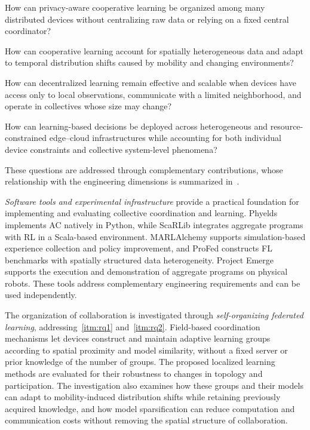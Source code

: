 \begin{questions}
\item
How can privacy-aware cooperative learning be organized among many distributed
devices without centralizing raw data or relying on a fixed central coordinator?
\label{itm:rq1}

\item
How can cooperative learning account for spatially heterogeneous data and adapt
to temporal distribution shifts caused by mobility and changing environments?
\label{itm:rq2}

\item
How can decentralized learning remain effective and scalable when devices have
access only to local observations, communicate with a limited neighborhood,
and operate in collectives whose size may change?
\label{itm:rq3}

\item
How can learning-based decisions be deployed across heterogeneous and
resource-constrained edge--cloud infrastructures while accounting for both
individual device constraints and collective system-level phenomena?
\label{itm:rq4}

\end{questions}

These questions are addressed through complementary contributions,
 whose relationship with the engineering dimensions is summarized
 in~.

\emph{Software tools and experimental infrastructure}
 provide a practical foundation for implementing and evaluating
 collective coordination and learning.
%
Phyelds implements \gls{AC} natively in Python,
 while ScaRLib integrates aggregate programs with \gls{RL} in a Scala-based environment.
%
MARLAlchemy supports simulation-based experience collection and policy improvement,
 and ProFed constructs \gls{FL} benchmarks with spatially structured data heterogeneity.
%
Project Emerge supports the execution and demonstration
 of aggregate programs on physical robots.
%
These tools address complementary engineering requirements
 and can be used independently.

The organization of collaboration is investigated through
 \emph{self-organizing federated learning},
 addressing~\ref{itm:rq1} and~\ref{itm:rq2}.
%
Field-based coordination mechanisms let devices construct
 and maintain adaptive learning groups according to spatial proximity and model similarity,
 without a fixed server or prior knowledge of the number of groups.
%
The proposed localized learning methods are evaluated
 for their robustness to changes in topology and participation.
%
The investigation also examines how these groups and their models can adapt
 to mobility-induced distribution shifts while retaining previously acquired knowledge,
 and how model sparsification can reduce computation and communication costs
 without removing the spatial structure of collaboration.

